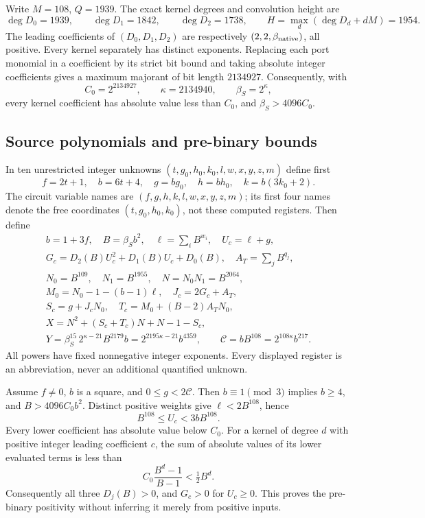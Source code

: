 Write $M=108$, $Q=1939$. The exact kernel degrees and convolution height are
\[
 \deg D_0=1939,\qquad\deg D_1=1842,\qquad\deg D_2=1738,\qquad
 H=\max_d(\deg D_d+dM)=1954.
\]
The leading coefficients of $(D_0,D_1,D_2)$ are respectively $(2,2,\beta_{\rm native})$, all positive. Every kernel separately has distinct exponents. Replacing each
port monomial in a coefficient by its strict bit bound and taking absolute
integer coefficients gives a maximum majorant of bit length $2134927$.
Consequently, with
\[
 C_0=2^{2134927},\qquad\kappa=2134940,\qquad\beta_S=2^\kappa,
\]
every kernel coefficient has absolute value less than $C_0$, and
$\beta_S>4096C_0$.

\subsection{Source polynomials and pre-binary bounds}

In ten unrestricted integer unknowns $(t,g_0,h_0,k_0,l,w,x,y,z,m)$ define first
\[f=2t+1,\quad b=6t+4,\quad g=bg_0,\quad h=bh_0,\quad k=b(3k_0+2).\]
The circuit variable names are $(f,g,h,k,l,w,x,y,z,m)$; its first four names denote the free coordinates $(t,g_0,h_0,k_0)$, not these computed registers. Then define
\begin{gather*}
 b=1+3f,\quad B=\beta_S b^2,\quad\ell=\sum_i B^{w_i},\quad U_c=\ell+g,\\
 G_c=D_2(B)U_c^2+D_1(B)U_c+D_0(B),\quad A_T=\sum_j B^{q_j},\\
 N_0=B^{109},\quad N_1=B^{1955},\quad N=N_0N_1=B^{2064},\\
 M_0=N_0-1-(b-1)\ell,\quad J_c=2G_c+A_T,\\
 S_c=g+J_cN_0,\quad T_c=M_0+(B-2)A_TN_0,\\
 X=N^2+(S_c+T_c)N+N-1-S_c,\\
 Y=\beta_S^{15}\,2^{\kappa-21}B^{2179}b
   =2^{2195\kappa-21}b^{4359},\qquad
 \mathcal C=bB^{108}=2^{108\kappa}b^{217}.
\end{gather*}
All powers have fixed nonnegative integer exponents. Every displayed
register is an abbreviation, never an additional quantified unknown.

Assume $f\ne0$, $b$ is a square, and $0\le g<2\mathcal C$.
Then $b\equiv1\pmod3$ implies $b\ge4$, and $B>4096C_0b^2$.
Distinct positive weights give $\ell<2B^{108}$, hence
\[
 B^{108}\le U_c<3bB^{108}.
\]
Every lower coefficient has absolute value below $C_0$. For a kernel of degree $d$ with positive integer leading coefficient $c$, the sum of absolute values of its lower evaluated terms is less than
\[
 C_0\frac{B^d-1}{B-1}<\tfrac12B^d.
\]
Consequently all three $D_j(B)>0$, and $G_c>0$ for $U_c\ge0$. This proves the pre-binary positivity without inferring it merely from positive inputs.

